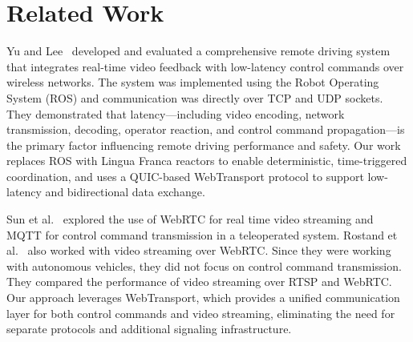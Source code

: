 \section{Related Work}
\label{sec:related-work}
    Yu and Lee~\cite{YuL22} developed and evaluated a comprehensive remote driving system that integrates real-time video feedback with low-latency control commands over wireless networks. The system was implemented using the Robot Operating System (ROS) and communication was directly over TCP and UDP sockets. They demonstrated that latency—including video encoding, network transmission, decoding, operator reaction, and control command propagation—is the primary factor influencing remote driving performance and safety. Our work replaces ROS with Lingua Franca reactors to enable deterministic, time-triggered coordination, and uses a QUIC-based WebTransport protocol to support low-latency and bidirectional data exchange.

    Sun et al.~\cite{SunTsai25} explored the use of WebRTC for real time video streaming and MQTT for control command transmission in a teleoperated system. Rostand et al.~\cite{FezeuCZDVBS+26} also worked with video streaming over WebRTC. Since they were working with autonomous vehicles, they did not focus on control command transmission. They compared the performance of video streaming over RTSP and WebRTC. Our approach leverages WebTransport, which provides a unified communication layer for both control commands and video streaming, eliminating the need for separate protocols and additional signaling infrastructure.

